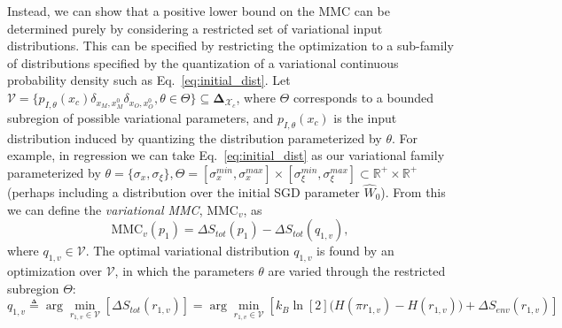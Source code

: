 \documentclass[12pt,onecolumn, margin=1in]{IEEEtran}
\newcommand{\Wh}{\hat{W}}
\newcommand{\compsimplex}{\boldsymbol{\Delta}_{\mathcal{X}_c}}
\begin{document}
Instead, we can show that a positive lower bound on the MMC can be determined purely by considering a restricted set of variational input distributions. This can be specified by restricting the optimization to a sub-family of distributions specified by the quantization of a variational continuous probability density such as Eq.~\eqref{eq:initial_dist}. Let $\mathcal{V} = \{p_{I,\theta}(x_c)\delta_{x_M,x_M^0} \delta_{x_O,x_O^0}, \theta \in \Theta \} \subseteq \compsimplex$, where $\Theta$ corresponds to a bounded subregion of possible variational parameters, and $p_{I, \theta}(x_c)$ is the input distribution induced by quantizing the distribution parameterized by $\theta$. For example, in regression we can take Eq.~\eqref{eq:initial_dist} as our variational family parameterized by $\theta = \{\sigma_x,\sigma_\xi\}, \Theta = [\sigma_x^{min}, \sigma_x^{max}] \times [\sigma_\xi^{min}, \sigma_\xi^{max}] \subset \mathbb{R^+} \times \mathbb{R^+}$ (perhaps including a distribution over the initial SGD parameter $\Wh_0$). From this we can define the \textit{variational MMC}, MMC$_v$, as
\begin{equation}
    \text{MMC}_v(p_1) = \Delta S_{tot}(p_1) - \Delta S_{tot}(q_{1,v}),
\end{equation}
where $q_{1,v} \in \mathcal{V}$. The optimal variational distribution $q_{1,v}$ is found by an optimization over $\mathcal{V}$, in which the parameters $\theta$ are varied through the restricted subregion $\Theta$:
\begin{equation}
    \label{eq:mmc_var_opt}
    q_{1,v} \triangleq \arg \min_{r_{1,v} \in \mathcal{V}}[\Delta S_{tot}(r_{1,v})] = \arg \min_{r_{1,v} \in \mathcal{V}}[k_B \ln[2] \big (H(\pi r_{1,v}) - H(r_{1,v}) \big )+\Delta S_{env}(r_{1,v})]
\end{equation}
\end{document}

